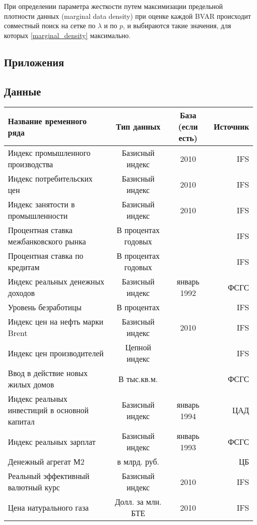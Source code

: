 \documentclass[11pt]{article} %
\begin{document}
При определении параметра жесткости путем максимизации предельной плотности данных (marginal data density) при оценке каждой BVAR происходит совместный поиск на сетке по $\lambda$ и по $p$, и выбираются такие значения, для которых \eqref{marginal_density} максимально.  
\newpage

\printbibliography
\newpage
\begin{landscape}
\section*{Приложения}
\subsection*{Данные}
\begin{center}
\begin{table}[h!]
\begin{tabular}{lccr}
\toprule
Название временного ряда& Тип данных &  База (если есть) & Источник \\
\midrule
Индекс промышленного производства & Базисный индекс & 2010 & IFS \\
Индекс потребительских цен & Базисный индекс & 2010 & IFS \\
Индекс занятости в промышленности & Базисный индекс & 2010 & IFS \\
Процентная ставка межбанковского рынка & В процентах годовых &  & IFS \\
Процентная ставка по кредитам & В процентах годовых &  & IFS \\
Индекс реальных денежных доходов & Базисный индекс & январь 1992 & ФСГС\\
Уровень безработицы & В процентах &  & IFS \\
Индекс цен на нефть марки Brent & Базисный индекс & 2010 & IFS \\
Индекс цен производителей & Цепной индекс &  & IFS \\
Ввод в действие новых жилых домов & В тыс.кв.м. &  & ФСГС \\
Индекс реальных инвестиций в основной капитал& Базисный индекс & январь 1994 & ЦАД \\
Индекс реальных зарплат & Базисный индекс & январь 1993 & ФСГС \\
Денежный агрегат М2 & в млрд. руб.  &  & ЦБ \\
Реальный эффективный валютный курс & Базисный индекс & 2010 & IFS \\
Цена натурального газа & Долл. за млн. БТЕ & 2010 & IFS \\

\end{tabular}
\end{table}
\end{center}
\end{landscape}
\end{document}

